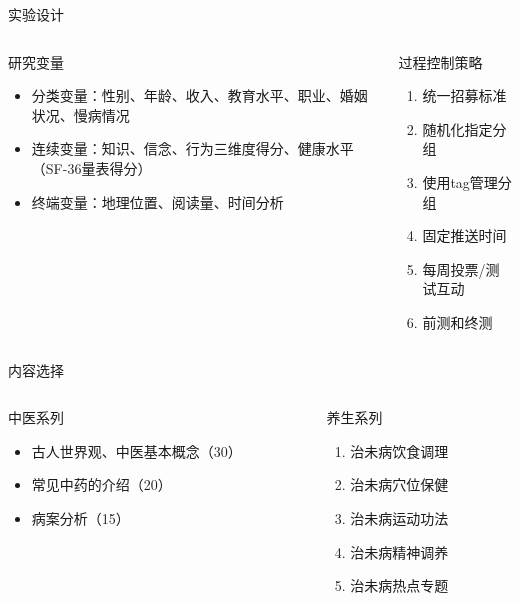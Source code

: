 \begin{frame}{实验设计}
\begin{columns}
    \begin{column}{0.5\textwidth}
\begin{exampleblock}{研究变量}
    \begin{itemize}
        \item 分类变量：性别、年龄、收入、教育水平、职业、婚姻状况、慢病情况
        \item 连续变量：知识、信念、行为三维度得分、健康水平（SF-36量表得分）
        \item 终端变量：地理位置、阅读量、时间分析
    \end{itemize}
\end{exampleblock}
    \end{column}
\begin{column}{0.5\textwidth}
\begin{alertblock}{过程控制策略}
    \begin{enumerate}
        \item 统一招募标准 
        \item 随机化指定分组
        \item 使用tag管理分组
         \item 固定推送时间
        \item 每周投票/测试互动
        \item 前测和终测
    \end{enumerate}
\end{alertblock}
\end{column}
\end{columns}
\end{frame}

\begin{frame}{内容选择}
\begin{columns}
    \begin{column}{0.5\textwidth}
    \begin{block}{中医系列}
        \begin{itemize}
            \item 古人世界观、中医基本概念（30）
            \item 常见中药的介绍（20）
            \item 病案分析（15）
        \end{itemize}
    \end{block}
\end{column}
\begin{column}{0.5\textwidth}
    \begin{block}{养生系列}
        \begin{enumerate}
            \item 治未病饮食调理
            \item 治未病穴位保健
            \item 治未病运动功法
            \item 治未病精神调养
            \item 治未病热点专题
        \end{enumerate}
    \end{block}
\end{column}
\end{columns}
\end{frame}

